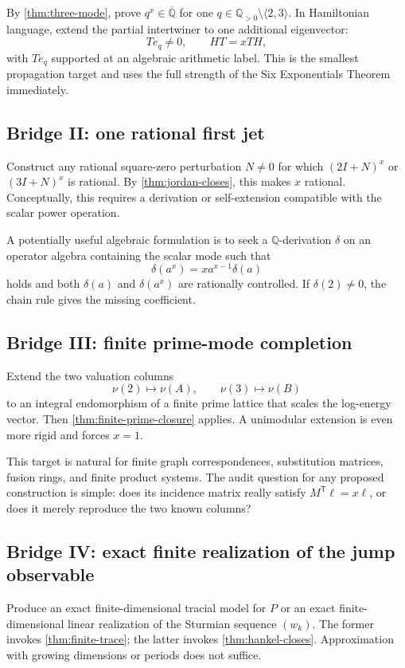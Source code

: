 \documentclass[11pt,oneside]{article}
\theoremstyle{definition}
\theoremstyle{remark}
\newcommand{\Q}{\mathbb Q}
\newcommand{\Qp}{\mathbb Q_{>0}}
\newcommand{\Alg}{\overline{\mathbb Q}}
\begin{document}
By \cref{thm:three-mode}, prove \(q^x\in\Alg\) for one
\(q\in\Qp\setminus\langle2,3\rangle\).  In Hamiltonian language, extend
the partial intertwiner to one additional eigenvector:
\[
        Te_q\neq0,\qquad HT=xTH,
\]
with \(Te_q\) supported at an algebraic arithmetic label.  This is the
smallest propagation target and uses the full strength of the Six
Exponentials Theorem immediately.

\subsection{Bridge II: one rational first jet}

Construct any rational square-zero perturbation \(N\neq0\) for which
\((2I+N)^x\) or \((3I+N)^x\) is rational.  By
\cref{thm:jordan-closes}, this makes \(x\) rational.  Conceptually, this
requires a derivation or self-extension compatible with the scalar
power operation.

A potentially useful algebraic formulation is to seek a
\(\Q\)-derivation \(\delta\) on an operator algebra containing the
scalar mode such that
\[
        \delta(a^x)=x a^{x-1}\delta(a)
\]
holds and both \(\delta(a)\) and \(\delta(a^x)\) are rationally
controlled.  If \(\delta(2)\neq0\), the chain rule gives the missing
coefficient.

\subsection{Bridge III: finite prime-mode completion}

Extend the two valuation columns
\[
        \nu(2)\longmapsto\nu(A),\qquad
        \nu(3)\longmapsto\nu(B)
\]
to an integral endomorphism of a finite prime lattice that scales the
log-energy vector.  Then \cref{thm:finite-prime-closure} applies.  A
unimodular extension is even more rigid and forces \(x=1\).

This target is natural for finite graph correspondences, substitution
matrices, fusion rings, and finite product systems.  The audit question
for any proposed construction is simple: does its incidence matrix
really satisfy \(M^{\mathsf T}\ell=x\ell\), or does it merely reproduce
the two known columns?

\subsection{Bridge IV: exact finite realization of the jump observable}

Produce an exact finite-dimensional tracial model for \(P\) or an exact
finite-dimensional linear realization of the Sturmian sequence
\((w_k)\).  The former invokes \cref{thm:finite-trace}; the latter invokes
\cref{thm:hankel-closes}.  Approximation with growing dimensions or
periods does not suffice.
\end{document}

